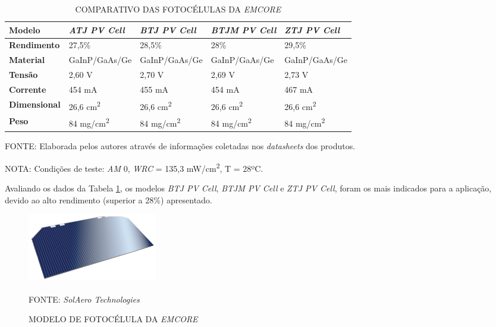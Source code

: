 \documentclass[
	12pt,				%
	openright,			%
	oneside,			%
	a4paper,			%
	english,			%
	french,				%
	spanish,			%
	brazil,				%
	oldfontcommands
	]{abntex2}
\begin{document}
	\begin{table}[th] 
	\caption{COMPARATIVO DAS FOTOCÉLULAS DA \textit{EMCORE}}
	\label{Tab_Emcore_Comp}
	\begin{tabular}{p{2.5cm}|p{3.1cm}|p{3.1cm}|p{3.1cm}|p{3.1cm}}
		\textbf{Modelo} & \textit{\textbf{ATJ PV Cell}} & \textit{\textbf{BTJ PV Cell}} & \textit{\textbf{BTJM PV Cell}} & \textit{\textbf{ZTJ PV Cell}} \\
		\hline
		\textbf{Rendimento} & 27,5\% & 28,5\% & 28\% & 29,5\% \\
		\hline
		\textbf{Material} & GaInP/GaAs/Ge & GaInP/GaAs/Ge & GaInP/GaAs/Ge & GaInP/GaAs/Ge\\
		\hline
		\textbf{Tensão} & 2,60 V & 2,70 V & 2,69 V & 2,73 V\\
		\hline
		\textbf{Corrente} & 454 mA & 455 mA & 454 mA & 467 mA\\
		\hline
		\textbf{Dimensional} & 26,6 cm\textsuperscript{2} & 26,6 cm\textsuperscript{2} & 26,6 cm\textsuperscript{2} & 26,6 cm\textsuperscript{2}\\
		\hline
		\textbf{Peso} & 84 mg/cm\textsuperscript{2} & 84 mg/cm\textsuperscript{2} & 84 mg/cm\textsuperscript{2} & 84 mg/cm\textsuperscript{2}\\
	\end{tabular}
	
	\begin{small}
	\vspace{3pt}
		FONTE: Elaborada pelos autores através de informações coletadas nos \textit{datasheets} dos produtos.
	\end{small}
	\begin{footnotesize}
		NOTA: Condições de teste: \textit{AM} 0, \textit{WRC} = 135,3 mW/cm\textsuperscript{2}, T = 28ºC.
	\end{footnotesize}
	\end{table}
	\pagebreak
	Avaliando os dados da Tabela \ref{Tab_Emcore_Comp}, os modelos \textit{BTJ PV Cell}, \textit{BTJM PV Cell} e \textit{ZTJ PV Cell}, foram os mais indicados para a aplicação, devido ao alto rendimento (superior a 28\%) apresentado.
	
	\begin{figure}[th]
		\caption{MODELO DE FOTOCÉLULA DA \textit{EMCORE}}
		\label{Fig_Cell_Emcore}
		\centering
		\includegraphics[width=0.5\linewidth]{./figs/ZTJ}
			
		\begin{small}
			FONTE: \textit{SolAero Technologies}\textsuperscript{\cite{Emcore3}}
		\end{small}		
	\end{figure}
\end{document}
